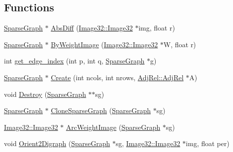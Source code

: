 \subsection*{Functions}
\begin{DoxyCompactItemize}
\item 
\hyperlink{namespacegft_1_1SparseGraph_ac9894ef1cb4a15f8970806af9f79cc3f}{Sparse\-Graph} $\ast$ \hyperlink{namespacegft_1_1SparseGraph_ae46c44f103adfb8c8b3af36d652f17cc}{Abs\-Diff} (\hyperlink{namespacegft_1_1Image32_a6c5a03566b593bb406f1fe33266a0382}{Image32\-::\-Image32} $\ast$img, float r)
\item 
\hyperlink{namespacegft_1_1SparseGraph_ac9894ef1cb4a15f8970806af9f79cc3f}{Sparse\-Graph} $\ast$ \hyperlink{namespacegft_1_1SparseGraph_aef9b7c44fdac1bc0074e36268a9a4118}{By\-Weight\-Image} (\hyperlink{namespacegft_1_1Image32_a6c5a03566b593bb406f1fe33266a0382}{Image32\-::\-Image32} $\ast$W, float r)
\item 
int \hyperlink{namespacegft_1_1SparseGraph_a0b89b539956863317a121d0772d659d2}{get\-\_\-edge\-\_\-index} (int p, int q, \hyperlink{namespacegft_1_1SparseGraph_ac9894ef1cb4a15f8970806af9f79cc3f}{Sparse\-Graph} $\ast$g)
\item 
\hyperlink{namespacegft_1_1SparseGraph_ac9894ef1cb4a15f8970806af9f79cc3f}{Sparse\-Graph} $\ast$ \hyperlink{namespacegft_1_1SparseGraph_a31c0ddf074368142c885769fa61d2a23}{Create} (int ncols, int nrows, \hyperlink{namespacegft_1_1AdjRel_a832ff5521af7a9801ff18dc3ae629b68}{Adj\-Rel\-::\-Adj\-Rel} $\ast$A)
\item 
void \hyperlink{namespacegft_1_1SparseGraph_a51b7e9f8c9f3848c0ebabddf5b61ecab}{Destroy} (\hyperlink{namespacegft_1_1SparseGraph_ac9894ef1cb4a15f8970806af9f79cc3f}{Sparse\-Graph} $\ast$$\ast$sg)
\item 
\hyperlink{namespacegft_1_1SparseGraph_ac9894ef1cb4a15f8970806af9f79cc3f}{Sparse\-Graph} $\ast$ \hyperlink{namespacegft_1_1SparseGraph_a0134886916189972a610d84e3d5d2fe5}{Clone\-Sparse\-Graph} (\hyperlink{namespacegft_1_1SparseGraph_ac9894ef1cb4a15f8970806af9f79cc3f}{Sparse\-Graph} $\ast$sg)
\item 
\hyperlink{namespacegft_1_1Image32_a6c5a03566b593bb406f1fe33266a0382}{Image32\-::\-Image32} $\ast$ \hyperlink{namespacegft_1_1SparseGraph_a886edc8a1608a7d03872491d12336b1b}{Arc\-Weight\-Image} (\hyperlink{namespacegft_1_1SparseGraph_ac9894ef1cb4a15f8970806af9f79cc3f}{Sparse\-Graph} $\ast$sg)
\item 
void \hyperlink{namespacegft_1_1SparseGraph_a431511499ba1f83941ca67c6a5c245c9}{Orient2\-Digraph} (\hyperlink{namespacegft_1_1SparseGraph_ac9894ef1cb4a15f8970806af9f79cc3f}{Sparse\-Graph} $\ast$sg, \hyperlink{namespacegft_1_1Image32_a6c5a03566b593bb406f1fe33266a0382}{Image32\-::\-Image32} $\ast$img, float per)
$$
\end{DoxyCompactItemize}
